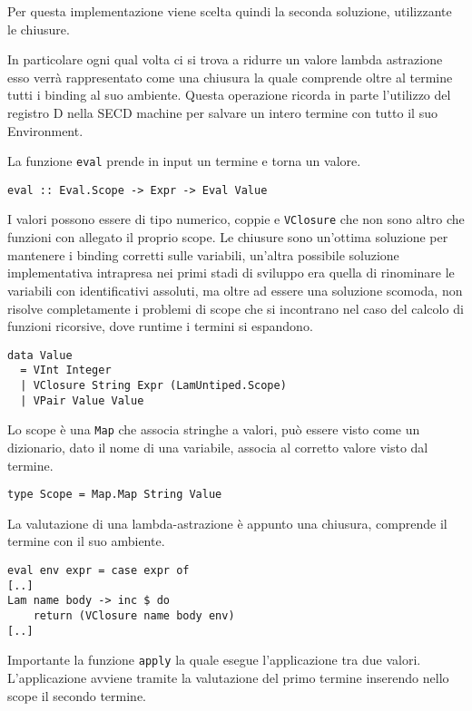 \documentclass{article}
\begin{document}
Per questa implementazione viene scelta quindi la seconda soluzione, utilizzante le chiusure.

In particolare ogni qual volta ci si trova a ridurre un valore lambda astrazione esso verrà rappresentato come una chiusura la quale comprende oltre al termine tutti i binding al suo ambiente. Questa operazione ricorda in parte l'utilizzo del registro D nella SECD machine per salvare un intero termine con tutto il suo Environment.

La funzione \texttt{eval} prende in input un termine e torna un valore.
\begin{verbatim}
eval :: Eval.Scope -> Expr -> Eval Value
\end{verbatim}

I valori possono essere di tipo numerico, coppie e \texttt{VClosure} che non sono altro che funzioni con allegato il proprio scope. Le chiusure sono un'ottima soluzione per mantenere i binding corretti sulle variabili, un'altra possibile soluzione implementativa intrapresa nei primi stadi di sviluppo era quella di rinominare le variabili con identificativi assoluti, ma oltre ad essere una soluzione scomoda, non risolve completamente i problemi di scope che si incontrano nel caso del calcolo di funzioni ricorsive, dove runtime i termini si espandono.

\begin{verbatim}
data Value
  = VInt Integer
  | VClosure String Expr (LamUntiped.Scope)
  | VPair Value Value
\end{verbatim}

Lo scope è una \texttt{Map} che associa stringhe a valori, può essere visto come un dizionario, dato il nome di una variabile, associa al corretto valore visto dal termine.

\begin{verbatim}
type Scope = Map.Map String Value
\end{verbatim}

La valutazione di una lambda-astrazione è appunto una chiusura, comprende il termine con il suo ambiente.

\begin{verbatim}
eval env expr = case expr of
[..]
Lam name body -> inc $ do
    return (VClosure name body env)
[..]
\end{verbatim}

Importante la funzione \texttt{apply} la quale esegue l'applicazione tra due valori. L'applicazione avviene tramite la valutazione del primo termine inserendo nello scope il secondo termine.
\end{document}

